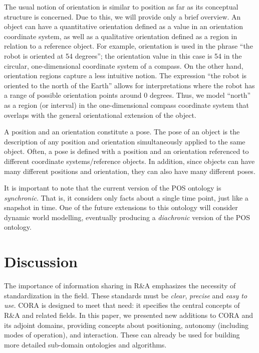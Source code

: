 \documentclass[preprint,12pt]{elsarticle}
\newcommand{\qm}[1]{``#1''}
\begin{document}
The usual notion of orientation is similar to position as far as its conceptual structure is concerned. Due to this, we will provide only a brief overview. An object can have a quantitative orientation defined as a value in an orientation coordinate system, as well as a qualitative orientation defined as a region in relation to a reference object. For example, orientation is used in the phrase \qm{the robot is oriented at 54 degrees}; the orientation value in this case is 54 in the circular, one-dimensional coordinate system of a compass. On the other hand, orientation regions capture a less intuitive notion. The expression \qm{the robot is oriented to the north of the Earth} allows for interpretations where the robot has a range of possible orientation points around 0 degrees. Thus, we model \qm{north} as a region (or interval) in the one-dimensional compass coordinate system that overlaps with the general orientational extension of the object.

A position and an orientation constitute a pose. The pose of an object is the description of any position and orientation simultaneously applied to the same object. Often, a pose is defined with a position and an orientation referenced to different coordinate systems/reference objects. In addition, since objects can have many different positions and orientation, they can also have many different poses.

It is important to note that the current version of the POS ontology is \emph{synchronic}. That is, it considers only facts about a single time point, just like a snapshot in time. One of the future extensions to this ontology will consider dynamic world modelling, eventually producing a \emph{diachronic} version of the POS ontology.


\section{Discussion}

The importance of information sharing in R\&A emphasizes the necessity of standardization in the field. These standards must be \emph{clear}, \emph{precise} and \emph{easy to use}. CORA is designed to meet that need: it specifies the central concepts of R\&A and related fields. In this paper, we presented new additions to CORA and its adjoint domains, providing concepts about positioning, autonomy (including modes of operation), and interaction. These can already be used for building more detailed sub-domain ontologies and algorithms. 
\end{document}
